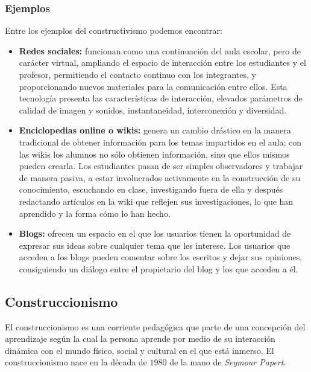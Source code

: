 \subsubsection{Ejemplos}

Entre los ejemplos del constructivismo podemos encontrar:

\begin{itemize}

\item \textbf{Redes sociales:} funcionan como una continuación del aula escolar,
    pero de carácter virtual, ampliando el espacio de interacción entre los
    estudiantes y el profesor, permitiendo el contacto continuo con los
    integrantes, y proporcionando nuevos materiales para la comunicación entre
    ellos. Esta tecnología presenta las características de interacción, elevados
    parámetros de calidad de imagen y sonidos, instantaneidad, interconexión y
    diversidad\cite{hernandez:constructivismo}. 

\item \textbf{Enciclopedias online o wikis:} genera un cambio drástico en la
    manera tradicional de obtener información para los temas impartidos en el
    aula; con las wikis los alumnos no sólo obtienen información, sino que ellos
    mismos pueden crearla. Los estudiantes pasan de ser simples observadores y
    trabajar de manera pasiva, a estar involucrados activamente en la
    construcción de su conocimiento, escuchando en clase, investigando fuera de
    ella  y después redactando artículos en la wiki que reflejen sus
    investigaciones, lo que han aprendido y la forma cómo lo han
    hecho\cite{hernandez:constructivismo}.

\item \textbf{Blogs:} ofrecen un espacio en el que los usuarios tienen la
    oportunidad de expresar sus ideas sobre cualquier tema que les interese. Los
    usuarios que acceden a los blogs pueden comentar sobre los escritos y dejar
    sus opiniones, consiguiendo un diálogo entre el propietario del blog y los
    que acceden a él\cite{hernandez:constructivismo}.
 
\end{itemize}

\subsection{Construccionismo}
\label{sec:tics_construccionismo}

El construccionismo es una corriente pedagógica que parte de una concepción del
aprendizaje según la cual la persona aprende por medio de su interacción
dinámica con el mundo físico, social y cultural en el que está
inmerso\cite{valdivia:sg}. El construccionismo nace en la década de $1980$ de la
mano de \textit{Seymour Papert}\cite{historia:2014,ict:ttc}.

